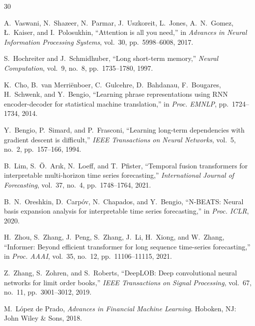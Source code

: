 \documentclass[conference]{IEEEtran}
\begin{document}
\begin{thebibliography}{30}

A.~Vaswani, N.~Shazeer, N.~Parmar, J.~Uszkoreit, L.~Jones, A.~N.~Gomez, \L.~Kaiser, and I.~Polosukhin, ``Attention is all you need,'' in \textit{Advances in Neural Information Processing Systems}, vol.~30, pp.~5998--6008, 2017.

S.~Hochreiter and J.~Schmidhuber, ``Long short-term memory,'' \textit{Neural Computation}, vol.~9, no.~8, pp.~1735--1780, 1997.

K.~Cho, B.~van Merri\"{e}nboer, C.~Gulcehre, D.~Bahdanau, F.~Bougares, H.~Schwenk, and Y.~Bengio, ``Learning phrase representations using RNN encoder-decoder for statistical machine translation,'' in \textit{Proc. EMNLP}, pp.~1724--1734, 2014.

Y.~Bengio, P.~Simard, and P.~Frasconi, ``Learning long-term dependencies with gradient descent is difficult,'' \textit{IEEE Transactions on Neural Networks}, vol.~5, no.~2, pp.~157--166, 1994.

B.~Lim, S.~\"{O}.~Ar{\i}k, N.~Loeff, and T.~Pfister, ``Temporal fusion transformers for interpretable multi-horizon time series forecasting,'' \textit{International Journal of Forecasting}, vol.~37, no.~4, pp.~1748--1764, 2021.

B.~N.~Oreshkin, D.~Carp\'{o}v, N.~Chapados, and Y.~Bengio, ``N-BEATS: Neural basis expansion analysis for interpretable time series forecasting,'' in \textit{Proc. ICLR}, 2020.

H.~Zhou, S.~Zhang, J.~Peng, S.~Zhang, J.~Li, H.~Xiong, and W.~Zhang, ``Informer: Beyond efficient transformer for long sequence time-series forecasting,'' in \textit{Proc. AAAI}, vol.~35, no.~12, pp.~11106--11115, 2021.

Z.~Zhang, S.~Zohren, and S.~Roberts, ``DeepLOB: Deep convolutional neural networks for limit order books,'' \textit{IEEE Transactions on Signal Processing}, vol.~67, no.~11, pp.~3001--3012, 2019.

M.~L\'{o}pez de Prado, \textit{Advances in Financial Machine Learning}. Hoboken, NJ: John Wiley \& Sons, 2018.


\end{thebibliography}
\end{document}
